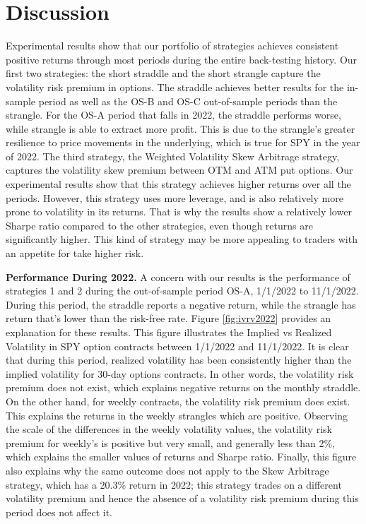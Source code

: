 \documentclass[10pt]{article}
\theoremstyle{definition}
\begin{document}
\section{Discussion}
Experimental results show that our portfolio of strategies achieves consistent positive returns through most periods during the entire back-testing history. Our first two strategies: the short straddle and the short strangle capture the volatility risk premium in options. The straddle achieves better results for the in-sample period as well as the OS-B and OS-C out-of-sample periods than the strangle. For the OS-A period that falls in 2022, the straddle performs worse, while strangle is able to extract more profit. This is due to the strangle's greater resilience to price movements in the underlying, which is true for SPY in the year of 2022. The third strategy, the Weighted Volatility Skew Arbitrage strategy, captures the volatility skew premium between OTM and ATM put options. Our experimental results show that this strategy achieves higher returns over all the periods. However, this strategy uses more leverage, and is also relatively more prone to volatility in its returns. That is why the results show a relatively lower Sharpe ratio compared to the other strategies, even though returns are significantly higher. This kind of strategy may be more appealing to traders with an appetite for take higher risk.

\textbf{Performance During 2022.} A concern with our results is the performance of strategies 1 and 2 during the out-of-sample period OS-A, 1/1/2022 to 11/1/2022. During this period, the straddle reports a negative return, while the strangle has return that's lower than the risk-free rate. Figure \ref{fig:ivrv2022} provides an explanation for these results. This figure illustrates the Implied vs Realized Volatility in SPY option contracts between 1/1/2022 and 11/1/2022. It is clear that during this period, realized volatility has been consistently higher than the implied volatility for 30-day options contracts. In other words, the volatility risk premium does not exist, which explains negative returns on the monthly straddle. On the other hand, for weekly contracts, the volatility risk premium does exist. This explains the returns in the weekly strangles which are positive. Observing the scale of the differences in the weekly volatility values, the volatility risk premium for weekly's is positive but very small, and generally less than 2\%, which explains the smaller values of returns and Sharpe ratio. Finally, this figure also explains why the same outcome does not apply to the Skew Arbitrage strategy, which has a 20.3\% return in 2022; this strategy trades on a different volatility premium and hence the absence of a volatility risk premium during this period does not affect it. 
\end{document}
